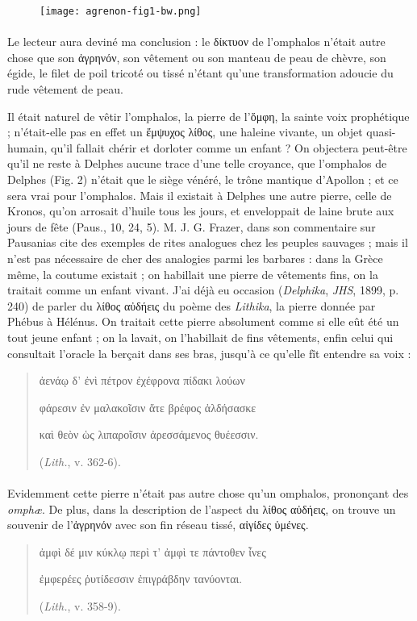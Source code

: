 \documentclass[a4paper, 11pt, oneside, polutonikogreek, french]{article}
\begin{document}
\begin{figure}[ht]
\centering
\texttt{[image: agrenon-fig1-bw.png]}
\end{figure}
\paragraph{}
Le lecteur aura deviné ma conclusion : le δίκτυον de l'omphalos n'était autre chose que son ἀγρηνόν, son vêtement ou son manteau de peau de chèvre, son égide, le filet de poil tricoté ou tissé n'étant qu'une transformation adoucie du rude vêtement de peau.

Il était naturel de vêtir l'omphalos, la pierre de l'ὄμφη, la sainte voix prophétique ; n'était-elle pas en effet un ἔμψυχος λίθος, une haleine vivante, un objet quasi-humain, qu'il fallait chérir et dorloter comme un enfant ? On objectera peut-être qu'il ne reste à Delphes aucune trace d'une telle croyance, que l'omphalos de Delphes (Fig. 2) n'était que le siège vénéré, le trône mantique d'Apollon ; et ce sera vrai pour l'omphalos. Mais il existait à Delphes une autre pierre, celle de Kronos, qu'on arrosait d'huile tous les jours, et enveloppait de laine brute aux jours de fête (Paus., 10, 24, 5). M. J. G. Frazer, dans son commentaire sur Pausanias cite des exemples de rites analogues chez les peuples sauvages ; mais il n'est pas nécessaire de cher des analogies parmi les barbares : dans la Grèce même, la coutume existait ; on habillait une pierre de vêtements fins, on la traitait comme un enfant vivant. J'ai déjà eu occasion (\emph{Delphika}, \emph{JHS}, 1899, p. 240) de parler du λίθος αὐδήεις du poème des \emph{Lithika}, la pierre donnée par Phébus à Hélénus. On traitait cette pierre absolument comme si elle eût été un tout jeune enfant ; on la lavait, on l'habillait de fins vêtements, enfin celui qui consultait l'oracle la berçait dans ses bras, jusqu'à ce qu'elle fît entendre sa voix :
\begin{quotation}\normalsize
ἀενάῳ δ' ἐνὶ πέτρον ἐχέφρονα πίδακι λούων

φάρεσιν ἐν μαλακοῖσιν ἅτε βρέφος ἀλδήσασκε

καὶ θεὸν ὡς λιπαροῖσιν ἀρεσσάμενος θυέεσσιν.

(\emph{Lith.}, v. 362-6).
\end{quotation}
\paragraph{}
Evidemment cette pierre n'était pas autre chose qu'un omphalos, prononçant des \emph{omphæ}. De plus, dans la description de l'aspect du λίθος αὐδήεις, on trouve un souvenir de l'ἀγρηνόν avec son fin réseau tissé, αἰγίδες ὑμένες.
\begin{quotation}\normalsize
ἀμφὶ δέ μιν κύκλῳ περὶ τ' ἀμφὶ τε πάντοθεν ἶνες

ἐμφερέες ῥυτίδεσσιν ἐπιγράβδην τανύονται.

(\emph{Lith.}, v. 358-9).
\end{quotation}
\end{document}

